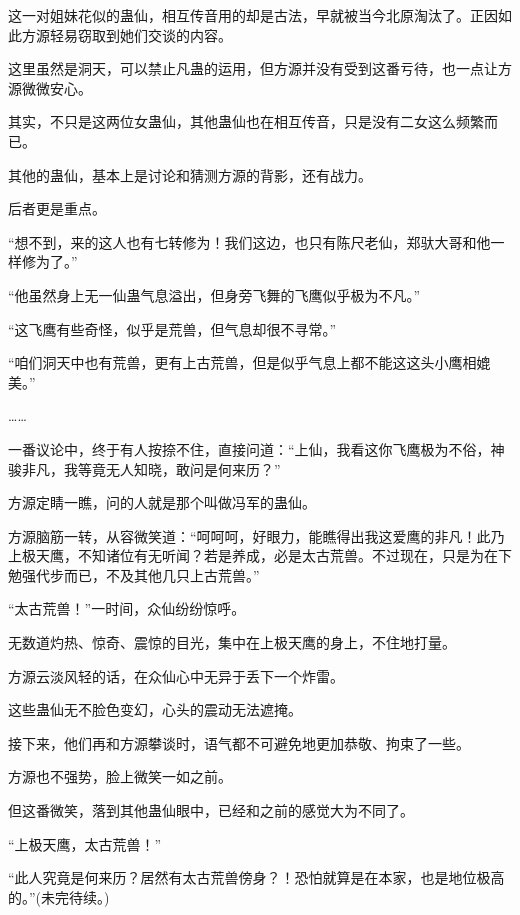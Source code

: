 \begin{this_body}
这一对姐妹花似的蛊仙，相互传音用的却是古法，早就被当今北原淘汰了。正因如此方源轻易窃取到她们交谈的内容。

这里虽然是洞天，可以禁止凡蛊的运用，但方源并没有受到这番亏待，也一点让方源微微安心。

其实，不只是这两位女蛊仙，其他蛊仙也在相互传音，只是没有二女这么频繁而已。

其他的蛊仙，基本上是讨论和猜测方源的背影，还有战力。

后者更是重点。

“想不到，来的这人也有七转修为！我们这边，也只有陈尺老仙，郑驮大哥和他一样修为了。”

“他虽然身上无一仙蛊气息溢出，但身旁飞舞的飞鹰似乎极为不凡。”

“这飞鹰有些奇怪，似乎是荒兽，但气息却很不寻常。”

“咱们洞天中也有荒兽，更有上古荒兽，但是似乎气息上都不能这这头小鹰相媲美。”

……

一番议论中，终于有人按捺不住，直接问道：“上仙，我看这你飞鹰极为不俗，神骏非凡，我等竟无人知晓，敢问是何来历？”

方源定睛一瞧，问的人就是那个叫做冯军的蛊仙。

方源脑筋一转，从容微笑道：“呵呵呵，好眼力，能瞧得出我这爱鹰的非凡！此乃上极天鹰，不知诸位有无听闻？若是养成，必是太古荒兽。不过现在，只是为在下勉强代步而已，不及其他几只上古荒兽。”

“太古荒兽！”一时间，众仙纷纷惊呼。

无数道灼热、惊奇、震惊的目光，集中在上极天鹰的身上，不住地打量。

方源云淡风轻的话，在众仙心中无异于丢下一个炸雷。

这些蛊仙无不脸色变幻，心头的震动无法遮掩。

接下来，他们再和方源攀谈时，语气都不可避免地更加恭敬、拘束了一些。

方源也不强势，脸上微笑一如之前。

但这番微笑，落到其他蛊仙眼中，已经和之前的感觉大为不同了。

“上极天鹰，太古荒兽！”

“此人究竟是何来历？居然有太古荒兽傍身？！恐怕就算是在本家，也是地位极高的。”(未完待续。)

\end{this_body}

